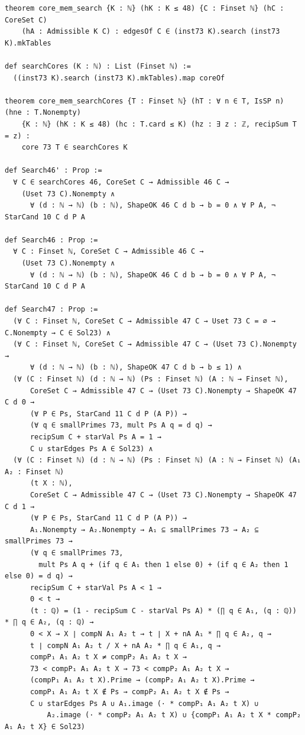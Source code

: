 \documentclass[11pt]{article}
\begin{document}
\begin{verbatim}
theorem core_mem_search {K : ℕ} (hK : K ≤ 48) {C : Finset ℕ} (hC : CoreSet C)
    (hA : Admissible K C) : edgesOf C ∈ (inst73 K).search (inst73 K).mkTables

def searchCores (K : ℕ) : List (Finset ℕ) :=
  ((inst73 K).search (inst73 K).mkTables).map coreOf

theorem core_mem_searchCores {T : Finset ℕ} (hT : ∀ n ∈ T, IsSP n) (hne : T.Nonempty)
    {K : ℕ} (hK : K ≤ 48) (hc : T.card ≤ K) (hz : ∃ z : ℤ, recipSum T = z) :
    core 73 T ∈ searchCores K

def Search46' : Prop :=
  ∀ C ∈ searchCores 46, CoreSet C → Admissible 46 C →
    (Uset 73 C).Nonempty ∧
      ∀ (d : ℕ → ℕ) (b : ℕ), ShapeOK 46 C d b → b = 0 ∧ ∀ P A, ¬ StarCand 10 C d P A

def Search46 : Prop :=
  ∀ C : Finset ℕ, CoreSet C → Admissible 46 C →
    (Uset 73 C).Nonempty ∧
      ∀ (d : ℕ → ℕ) (b : ℕ), ShapeOK 46 C d b → b = 0 ∧ ∀ P A, ¬ StarCand 10 C d P A

def Search47 : Prop :=
  (∀ C : Finset ℕ, CoreSet C → Admissible 47 C → Uset 73 C = ∅ → C.Nonempty → C ∈ Sol23) ∧
  (∀ C : Finset ℕ, CoreSet C → Admissible 47 C → (Uset 73 C).Nonempty →
      ∀ (d : ℕ → ℕ) (b : ℕ), ShapeOK 47 C d b → b ≤ 1) ∧
  (∀ (C : Finset ℕ) (d : ℕ → ℕ) (Ps : Finset ℕ) (A : ℕ → Finset ℕ),
      CoreSet C → Admissible 47 C → (Uset 73 C).Nonempty → ShapeOK 47 C d 0 →
      (∀ P ∈ Ps, StarCand 11 C d P (A P)) →
      (∀ q ∈ smallPrimes 73, mult Ps A q = d q) →
      recipSum C + starVal Ps A = 1 →
      C ∪ starEdges Ps A ∈ Sol23) ∧
  (∀ (C : Finset ℕ) (d : ℕ → ℕ) (Ps : Finset ℕ) (A : ℕ → Finset ℕ) (A₁ A₂ : Finset ℕ)
      (t X : ℕ),
      CoreSet C → Admissible 47 C → (Uset 73 C).Nonempty → ShapeOK 47 C d 1 →
      (∀ P ∈ Ps, StarCand 11 C d P (A P)) →
      A₁.Nonempty → A₂.Nonempty → A₁ ⊆ smallPrimes 73 → A₂ ⊆ smallPrimes 73 →
      (∀ q ∈ smallPrimes 73,
        mult Ps A q + (if q ∈ A₁ then 1 else 0) + (if q ∈ A₂ then 1 else 0) = d q) →
      recipSum C + starVal Ps A < 1 →
      0 < t →
      (t : ℚ) = (1 - recipSum C - starVal Ps A) * (∏ q ∈ A₁, (q : ℚ)) * ∏ q ∈ A₂, (q : ℚ) →
      0 < X → X ∣ compN A₁ A₂ t → t ∣ X + nA A₁ * ∏ q ∈ A₂, q →
      t ∣ compN A₁ A₂ t / X + nA A₂ * ∏ q ∈ A₁, q →
      compP₁ A₁ A₂ t X ≠ compP₂ A₁ A₂ t X →
      73 < compP₁ A₁ A₂ t X → 73 < compP₂ A₁ A₂ t X →
      (compP₁ A₁ A₂ t X).Prime → (compP₂ A₁ A₂ t X).Prime →
      compP₁ A₁ A₂ t X ∉ Ps → compP₂ A₁ A₂ t X ∉ Ps →
      C ∪ starEdges Ps A ∪ A₁.image (· * compP₁ A₁ A₂ t X) ∪
          A₂.image (· * compP₂ A₁ A₂ t X) ∪ {compP₁ A₁ A₂ t X * compP₂ A₁ A₂ t X} ∈ Sol23)
\end{verbatim}
\normalsize
\end{document}
